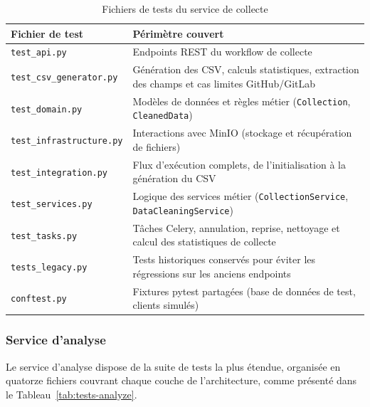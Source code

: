 \begin{table}[H]
\centering
\small
\caption{Fichiers de tests du service de collecte}
\label{tab:tests-collection}
\begin{tabular}{|>{\raggedright\arraybackslash}p{4.5cm}
                |>{\raggedright\arraybackslash}p{8.5cm}|}
\hline
\textbf{Fichier de test} & \textbf{Périmètre couvert} \\
\hline
\texttt{test\_api.py} & Endpoints REST du workflow de collecte \\
\hline
\texttt{test\_csv\_generator.py} & Génération des CSV, calculs statistiques, extraction des champs et cas limites GitHub/GitLab \\
\hline
\texttt{test\_domain.py} & Modèles de données et règles métier (\texttt{Collection}, \texttt{CleanedData}) \\
\hline
\texttt{test\_infrastructure.py} & Interactions avec MinIO (stockage et récupération de fichiers) \\
\hline
\texttt{test\_integration.py} & Flux d'exécution complets, de l'initialisation à la génération du CSV \\
\hline
\texttt{test\_services.py} & Logique des services métier (\texttt{CollectionService}, \texttt{DataCleaningService}) \\
\hline
\texttt{test\_tasks.py} & Tâches Celery, annulation, reprise, nettoyage et calcul des statistiques de collecte \\
\hline
\texttt{tests\_legacy.py} & Tests historiques conservés pour éviter les régressions sur les anciens endpoints \\
\hline
\texttt{conftest.py} & Fixtures pytest partagées (base de données de test, clients simulés) \\
\hline
\end{tabular}
\end{table}

\subsubsection*{Service d'analyse}

Le service d'analyse dispose de la suite de tests la plus étendue, organisée en quatorze fichiers
couvrant chaque couche de l'architecture, comme présenté dans le Tableau~\ref{tab:tests-analyze}.

